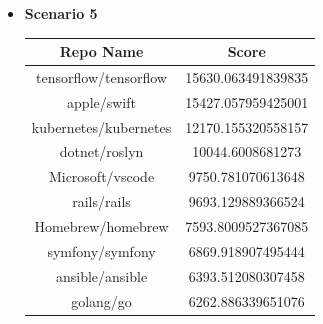 \documentclass[11pt]{article}
\begin{document}
\begin{itemize}
\begin{figure}[!ht]
\begin{subfigure}{.5\textwidth}
        \caption{Label Propagation con 2000 repositories.}
    \end{subfigure}
    \caption{Label Propagation all'aumentare del numero delle repositories.}
    \label{fig:TutteLeConfigurazioni}
\end{figure}

Si può notare in fig.\ref{fig:TutteLeConfigurazioni} che, tramite l'algoritmo di Label Propagation sono state identificate comunità che racchiudono le repo, i loro commit e contributori associati.

    \newpage
    \item \textbf{Scenario 5}

\begin{table}[!ht]
    \centering
    \begin{tabular}{cc}
    \toprule
    Repo Name & Score \\
    \midrule
    tensorflow/tensorflow & 15630.063491839835 \\
    apple/swift & 15427.057959425001 \\
    kubernetes/kubernetes & 12170.155320558157 \\
    dotnet/roslyn & 10044.6008681273 \\
    Microsoft/vscode & 9750.781070613648 \\
    rails/rails & 9693.129889366524 \\
    Homebrew/homebrew & 7593.8009527367085 \\
    symfony/symfony & 6869.918907495444 \\
    ansible/ansible & 6393.512080307458 \\
    golang/go & 6262.886339651076 \\
    \bottomrule
    \end{tabular}
\end{table}    
\end{itemize}
\end{document}
